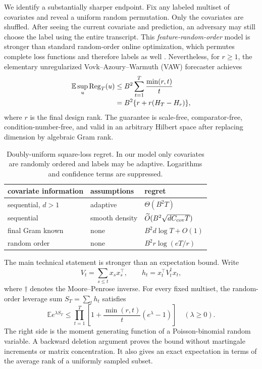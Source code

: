 \documentclass[twoside]{article}
\newcommand{\E}{\mathbb E}
\newcommand{\Reg}{\operatorname{Reg}}
\begin{document}
We identify a substantially sharper endpoint. Fix any labeled multiset of covariates and reveal a uniform random permutation. Only the covariates are shuffled. After seeing the current covariate and prediction, an adversary may still choose the label using the entire transcript. This \emph{feature-random-order} model is stronger than standard random-order online optimization, which permutes complete loss functions and therefore labels as well \citep{garber2020online,sherman2021optimal,bernasconi2025online}. Nevertheless, for $r\ge1$, the elementary unregularized Vovk--Azoury--Warmuth (VAW) forecaster achieves
\begin{align}
 \E\sup_u\Reg_T(u)
 &\le B^2\sum_{t=1}^T\frac{\min(r,t)}t\notag\\[-2pt]
 &=B^2\{r+r(H_T-H_r)\},
 \label{eq:intro-bound}
\end{align}
where $r$ is the final design rank. The guarantee is scale-free, comparator-free, condition-number-free, and valid in an arbitrary Hilbert space after replacing dimension by algebraic Gram rank.

\begin{table}[t]
\caption{Doubly-uniform square-loss regret. In our model only covariates are randomly ordered and labels may be adaptive. Logarithms and confidence terms are suppressed.}
\label{tab:phase}
\centering
\small
\setlength{\tabcolsep}{3.5pt}
\begin{tabular}{@{}lll@{}}
\toprule
covariate information & assumptions & regret \\
\midrule
sequential, $d>1$ & adaptive & $\Theta(B^2T)$ \\
sequential & smooth density & $\widetilde O(B^2\sqrt{dC_{\rm cov}T})$ \\
final Gram known & none & $B^2d\log T+O(1)$ \\
random order & none & $B^2r\log(eT/r)$ \\
\bottomrule
\end{tabular}
\end{table}

The main technical statement is stronger than an expectation bound. Write
\[
 V_t=\sum_{s\le t}x_sx_s^\top,
 \qquad h_t=x_t^\top V_t^\dagger x_t,
\]
where $\dagger$ denotes the Moore--Penrose inverse. For every fixed multiset, the random-order leverage sum $S_T=\sum_t h_t$ satisfies
\begin{equation}
 \E e^{\lambda S_T}
 \le \prod_{t=1}^T\left[1+\frac{\min(r,t)}{t}(e^\lambda-1)\right]
 \quad(\lambda\ge0).
 \label{eq:intro-mgf}
\end{equation}
The right side is the moment generating function of a Poisson-binomial random variable. A backward deletion argument proves the bound without martingale increments or matrix concentration. It also gives an exact expectation in terms of the average rank of a uniformly sampled subset.
\end{document}
